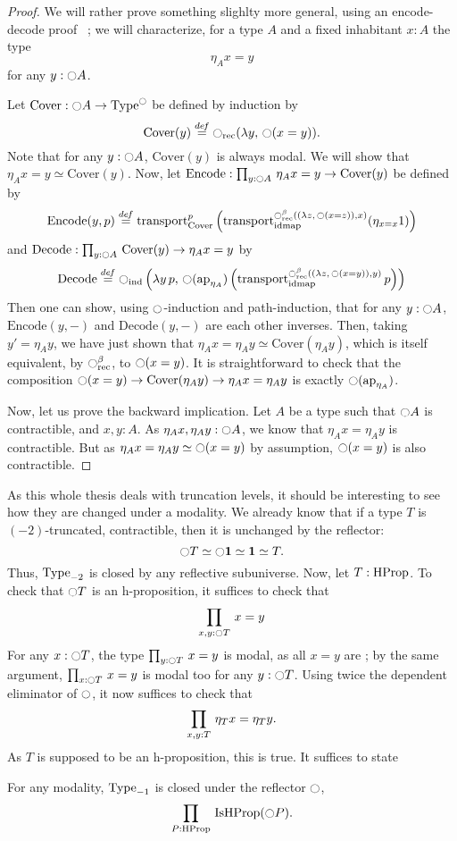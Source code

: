 \begin{proof}
  We will rather prove something slighlty more general, using an
  encode-decode proof~\cite[Section 8.9]{hottbook} ; we will
  characterize, for a type $A$ and a fixed inhabitant $x:A$ the type 
  \[ \eta_A x = y \] 
  for any $y:\ocircle A$.
  
  \newcommand{\Cover}{\mathrm{Cover}}
  \newcommand{\Encode}{\mathrm{Encode}}
  \newcommand{\Decode}{\mathrm{Decode}}
  Let $\Cover:\modal A \to \Type^\modal$ be defined by induction by
  \[ \Cover(y) \defeq \modal_{\mathrm{rec}} (\lambda y,\,\modal (x =
    y)). \]
  Note that for any $y:\ocircle A$, $\Cover(y)$ is always modal.
  We will show that $\eta_A x = y \simeq \Cover(y)$.
  Now, let $\Encode : \prodD y {\modal A} {\eta_A x = y \to
    \Cover(y)}$ be defined by
  \[ \Encode(y,p) \defeq \transport_{\Cover}^p
    \left(\transport_{\idmap}^{\modal_{\mathrm{rec}}^\beta ((\lambda
        z,\,\modal (x = z)), x)} (\eta_{x=x} 1)\right) \]
  and $\Decode:\prodD y {\modal A} {\Cover(y) \to \eta_A x = y}$ by
  \[
    \Decode \defeq \modal_{\mathrm{ind}} \left(\lambda y\,p,\,
    \modal(\ap{\eta_A})  \left(\transport_{\idmap}^{\modal_{\mathrm{rec}}^\beta ((\lambda
        z,\,\modal (x = y)),y)} p\right)\right)
  \]
  Then one can show, using $\ocircle$-induction and path-induction, that
  for any $y:\ocircle A$, $\Encode(y,-)$ and $\Decode(y,-)$
  are each other inverses. Then, taking $y' = \eta_A y$, we have just
  shown that $\eta_A x = \eta_A y \simeq \Cover(\eta_A y)$, which is
  itself equivalent, by $\ocircle_{\mathrm{rec}}^\beta$, to $\ocircle
  (x=y)$.
  It is straightforward to check that the composition $\modal (x=y)
  \to \Cover(\eta_A y) \to \eta_A x = \eta_A y$ is exactly $\ocircle
  (\mathrm{ap}_{\eta_A})$.
  
  Now, let us prove the backward implication. Let $A$ be a type such
  that $\ocircle A$ is contractible, and $x,y:A$. 
  As $\eta_A x,\eta_A y: \ocircle A$, we know that $\eta_A x = \eta_A y$
  is contractible. But as $\eta_A x = \eta_A y \simeq \ocircle (x=y)$ by
  assumption, $\ocircle (x=y)$ is also contractible.
\end{proof}

As this whole thesis deals with truncation levels, it should be
interesting to see how they are changed under a modality. 
We already know that if a type $T$ is $(-2)$-truncated, \ie{}
contractible, then it is unchanged by the reflector: \[\ocircle T \simeq
\ocircle \mathbf{1} \simeq \mathbf{1} \simeq T.\] Thus, $\operatorname{Type}_{-2}$ is closed by
any reflective subuniverse.
%
Now, let $T:\operatorname{HProp}$. To check that $\ocircle T$ is an h-proposition, it
suffices to check that \[\prod_{x,y:\ocircle T}\, x = y\] 
For any $x:\ocircle T$, the type $\prod_{y:\ocircle T}\, x = y$
is modal, as all $x=y$ are ; by the same argument, $\prod_{x:\ocircle T}\, x =
  y$ is modal too for any $y:\ocircle T$. 
Using twice the dependent eliminator of $\ocircle$, it now suffices to
check that \[\prod_{x,y:T}\, \eta_T x = \eta_T y.\]
As $T$ is supposed to be an h-proposition, this is true. It suffices
to state
\begin{lem}\label{lem:mod-hprop}
  For any modality, $\operatorname{Type}_{-1}$ is closed under the reflector
  $\ocircle$, \ie{} \[\prod_{P:\operatorname{HProp}}\, \operatorname{IsHProp} (\ocircle P).\]
\end{lem}


